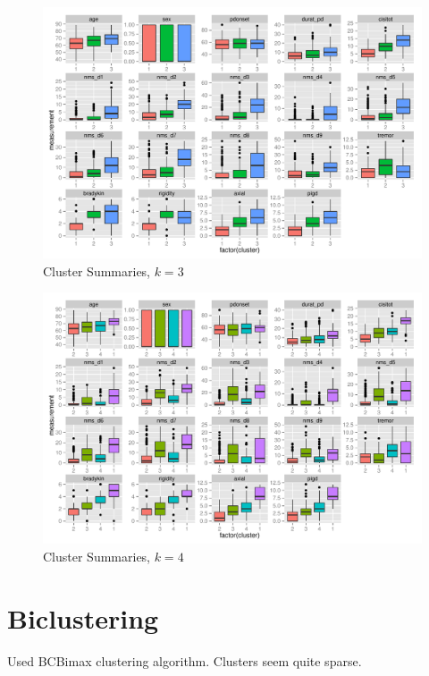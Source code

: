 \documentclass[letterpaper,12pt]{article}
\begin{document}
\begin{figure}[ht]
  \centering
  \includegraphics[width=\linewidth]{kmeans-summaries-3.pdf}
  \caption{Cluster Summaries, $k = 3$}
  \label{fig:kmeans-summaries-3}
\end{figure}

\begin{figure}[ht]
  \centering
  \includegraphics[width=\linewidth]{kmeans-summaries-4.pdf}
  \caption{Cluster Summaries, $k = 4$}
  \label{fig:kmeans-summaries-4}
\end{figure}

\section{Biclustering}

Used BCBimax clustering algorithm. Clusters seem quite sparse.
\end{document}
